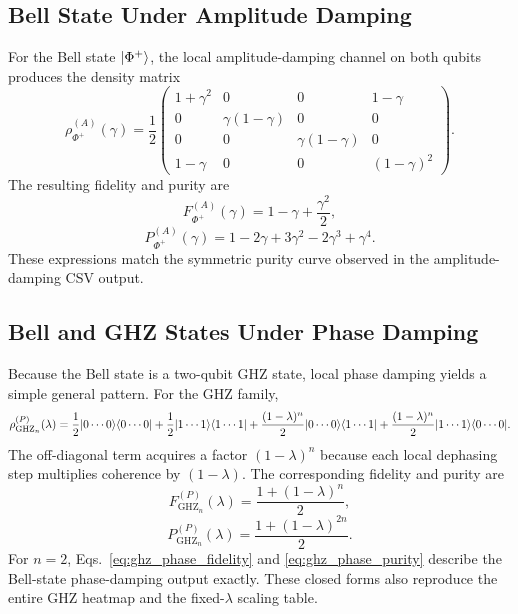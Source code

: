 \subsection{Bell State Under Amplitude Damping}

For the Bell state $\lvert \Phi^+ \rangle$, the local amplitude-damping channel on both qubits produces the density matrix
\begin{equation}
\rho_{\Phi^+}^{(A)}(\gamma)
=
\frac{1}{2}
\begin{pmatrix}
1+\gamma^2 & 0 & 0 & 1-\gamma \\
0 & \gamma(1-\gamma) & 0 & 0 \\
0 & 0 & \gamma(1-\gamma) & 0 \\
1-\gamma & 0 & 0 & (1-\gamma)^2
\end{pmatrix}.
\label{eq:bell_amp_exact}
\end{equation}
The resulting fidelity and purity are
\begin{equation}
F_{\Phi^+}^{(A)}(\gamma)
=
1 - \gamma + \frac{\gamma^2}{2},
\label{eq:bell_amp_fidelity}
\end{equation}
\begin{equation}
P_{\Phi^+}^{(A)}(\gamma)
=
1 - 2\gamma + 3\gamma^2 - 2\gamma^3 + \gamma^4.
\label{eq:bell_amp_purity}
\end{equation}
These expressions match the symmetric purity curve observed in the amplitude-damping CSV output.

\subsection{Bell and GHZ States Under Phase Damping}

Because the Bell state is a two-qubit GHZ state, local phase damping yields a simple general pattern. For the GHZ family,
\begin{equation}
\rho_{\mathrm{GHZ}_n}^{(P)}(\lambda)
=
\frac{1}{2}\lvert 0\cdots 0 \rangle\langle 0\cdots 0 \rvert
+
\frac{1}{2}\lvert 1\cdots 1 \rangle\langle 1\cdots 1 \rvert
+
\frac{(1-\lambda)^n}{2}\lvert 0\cdots 0 \rangle \langle 1\cdots 1 \rvert
+
\frac{(1-\lambda)^n}{2}\lvert 1\cdots 1 \rangle \langle 0\cdots 0 \rvert.
\label{eq:ghz_phase_exact}
\end{equation}
The off-diagonal term acquires a factor $(1-\lambda)^n$ because each local dephasing step multiplies coherence by $(1-\lambda)$. The corresponding fidelity and purity are
\begin{equation}
F_{\mathrm{GHZ}_n}^{(P)}(\lambda)
=
\frac{1 + (1-\lambda)^n}{2},
\label{eq:ghz_phase_fidelity}
\end{equation}
\begin{equation}
P_{\mathrm{GHZ}_n}^{(P)}(\lambda)
=
\frac{1 + (1-\lambda)^{2n}}{2}.
\label{eq:ghz_phase_purity}
\end{equation}
For $n=2$, Eqs.~\eqref{eq:ghz_phase_fidelity} and \eqref{eq:ghz_phase_purity} describe the Bell-state phase-damping output exactly. These closed forms also reproduce the entire GHZ heatmap and the fixed-$\lambda$ scaling table.


